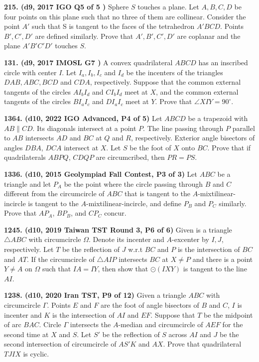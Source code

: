 \documentclass{article}
\begin{document}
\textbf{215. (\color{red}d9\color{black}, 2017 IGO Q5 of 5 )} Sphere $S$ touches a plane. Let $A, B, C, D$ be four points on this plane such that no three of them are collinear. Consider the point $A'$ such that S is tangent to the faces of the tetrahedron $A'BCD.$ Points $B', C', D'$ are defined similarly. Prove that $A', B', C', D'$ are coplanar and the plane $A'B'C'D'$ touches $S.$

\textbf{131. (\color{red}d9\color{black}, 2017 IMOSL G7     )} A convex quadrilateral $ABCD$ has an inscribed circle with center $I$. Let $I_a, I_b, I_c$ and $I_d$ be the incenters of the triangles $DAB, ABC, BCD$ and $CDA$, respectively. Suppose that the common external tangents of the circles $AI_bI_d$ and $CI_bI_d$ meet at $X$, and the common external tangents of the circles $BI_aI_c$ and $DI_aI_c$ meet at $Y$. Prove that $\angle{XIY}=90^{\circ}$.

\textbf{1364. (\color{red}d10\color{black}, 2022 IGO Advanced, P4 of 5)} Let $ABCD$ be a trapezoid with $AB\parallel CD$. Its diagonals intersect at a point $P$. The line passing through $P$ parallel to $AB$ intersects $AD$ and $BC$ at $Q$ and $R$, respectively. Exterior angle bisectors of angles $DBA$, $DCA$ intersect at $X$. Let $S$ be the foot of $X$ onto $BC$. Prove that if quadrilaterals $ABPQ$, $CDQP$ are circumcribed, then $PR=PS$.

\textbf{1336. (\color{red}d10\color{black}, 2015 Geolympiad Fall Contest, P3 of 3)} Let $ABC$ be a triangle and let $P_A$ be the point where the circle passing through $B$ and $C$ different from the circumcircle of $ABC$ that is tangent to the $A$-mixtilinear-incircle is tangent to the $A$-mixtilinear-incircle, and define $P_B$ and $P_C$ similarly. Prove that $AP_A$, $BP_B$, and $CP_C$ concur.

\textbf{1245. (\color{red}d10\color{black}, 2019 Taiwan TST Round 3, P6 of 6)} Given is a triangle $ \triangle{ABC} $ with circumcircle $ \Omega $. Denote its incenter and $ A $-excenter by $ I, J $, respectively. Let $ T $ be the reflection of $ J $ w.r.t $ BC $ and $ P $ is the intersection of $ BC $ and $ AT $. If the circumcircle of $ \triangle{AIP} $ intersects $ BC $ at $ X \neq P $ and there is a point $ Y \neq A $ on $ \Omega $ such that $ IA = IY $, then show that $ \odot\left(IXY\right) $ is tangent to the line $ AI $.

\textbf{1238. (\color{red}d10\color{black}, 2020 Iran TST, P9 of 12)} Given a triangle $ABC$ with circumcircle $\Gamma$. Points $E$ and $F$ are the foot of angle bisectors of $B$ and $C$, $I$ is incenter and $K$ is the intersection of $AI$ and $EF$. Suppose that $T$ be the midpoint of arc $BAC$. Circle $\Gamma$ intersects the $A$-median and circumcircle of $AEF$ for the second time at $X$ and $S$. Let $S'$ be the reflection of $S$ across $AI$ and $J$ be the second intersection of circumcircle of $AS'K$ and $AX$. Prove that quadrilateral $TJIX$ is cyclic.
\end{document}
